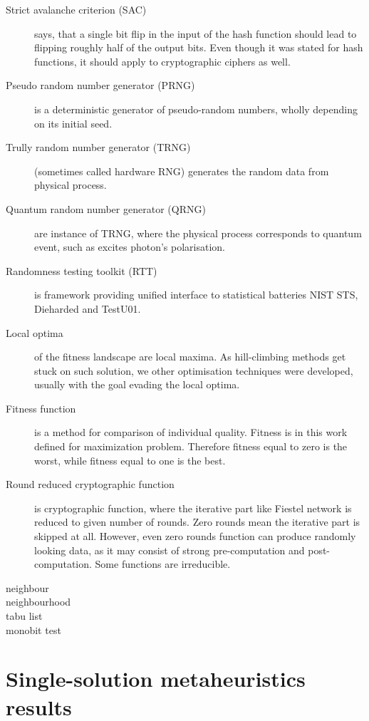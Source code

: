 \documentclass[
  print, %
  Table,   %
  nolof,     %
  nolot,     %
  11pt, %
  oneside  %
]{fithesis3}
\begin{document}
\begin{description}
    \item[Strict avalanche criterion (SAC)] says, that a single bit flip in the input of the hash function should lead to flipping roughly half of the output bits. Even though it was stated for hash functions, it should apply to cryptographic ciphers as well.
    \item[Pseudo random number generator (PRNG)] is a deterministic generator of pseudo-random numbers, wholly depending on its initial seed.
    \item[Trully random number generator (TRNG)] (sometimes called hardware RNG) generates the random data from physical process.
    \item[Quantum random number generator (QRNG)] are instance of TRNG, where the physical process corresponds to quantum event, such as excites photon's polarisation.
    \item[Randomness testing toolkit (RTT)] is framework providing unified interface to statistical batteries NIST STS, Dieharded and TestU01.
    \item[Local optima] of the fitness landscape are local maxima. As hill-climbing methods get stuck on such solution, we other optimisation techniques were developed, usually with the goal evading the local optima.
    \item[Fitness function] is a method for comparison of individual quality. Fitness is in this work defined for maximization problem. Therefore fitness equal to zero is the worst, while fitness equal to one is the best.
    \item[Round reduced cryptographic function] is cryptographic function, where the iterative part like Fiestel network is reduced to given number of rounds. Zero rounds mean the iterative part is skipped at all. However, even zero rounds function can produce randomly looking data, as it may consist of strong pre-computation and post-computation. Some functions are irreducible.
    \item[neighbour]
    \item[neighbourhood]
    \item[tabu list]
    \item[monobit test]
\end{description}

\section{Single-solution metaheuristics results}
\label{sec:app-ss-res}
\end{document}
